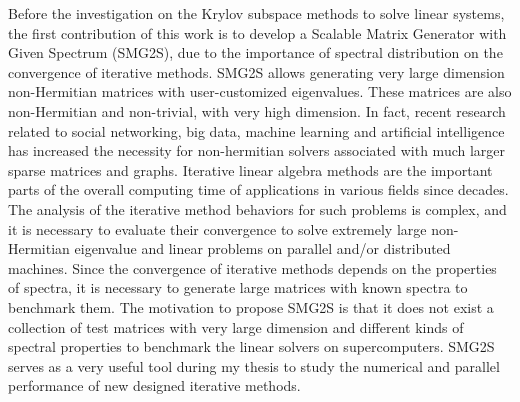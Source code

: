Before the investigation on the Krylov subspace methods to solve linear systems, the first contribution of this work is to develop a Scalable Matrix Generator with Given Spectrum (SMG2S), due to the importance of spectral distribution on the convergence of iterative methods. SMG2S allows generating very large dimension non-Hermitian matrices with user-customized eigenvalues. These matrices are also non-Hermitian and non-trivial, with very high dimension. In fact, recent research related to social networking, big data, machine learning and artificial intelligence has increased the necessity for non-hermitian solvers associated with much larger sparse matrices and graphs. Iterative linear algebra methods are the important parts of the overall computing time of applications in various fields since decades. The analysis of the iterative method behaviors for such problems is complex, and it is necessary to evaluate their convergence to solve extremely large non-Hermitian eigenvalue and linear problems on parallel and/or distributed machines. Since the convergence of iterative methods depends on the properties of spectra, it is necessary to generate large matrices with known spectra to benchmark them. The motivation to propose SMG2S is that it does not exist a collection of test matrices with very large dimension and different kinds of spectral properties to benchmark the linear solvers on supercomputers. SMG2S serves as a very useful tool during my thesis to study the numerical and parallel performance of new designed iterative methods.


